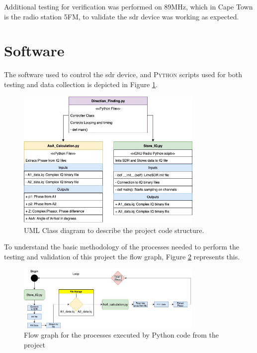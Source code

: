 \documentclass[class=report,11pt,crop=false]{standalone}
\begin{document}
Additional testing for verification was performed on 89MHz, which in Cape Town is the radio station 5FM, to validate the \gls{sdr} device was working as expected.

\section{Software \label{sec:Software-Meth}}
The software used to control the \gls{sdr} device, and \textsc{Python} scripts used for both testing and data collection is depicted in Figure \ref{fig:uml}.

\begin{figure}[h]
    \centering
    \includegraphics[width=0.8\textwidth]{Images/diagrams/class Software SDR.jpg}
    \caption{UML Class diagram to describe the project code structure.}
    \label{fig:uml}
\end{figure}
To understand the basic methodology of the processes needed to perform the testing and validation of this project the flow graph, Figure \ref{fig:flow} represents this. 

\begin{figure}[h]
    \centering
    \includegraphics[width=0.8\textwidth]{Images/diagrams/Activity Software SDR.jpg}
    \caption{Flow graph for the processes executed by Python code from the project}
    \label{fig:flow}
\end{figure}
\end{document}
